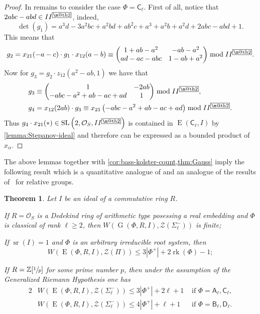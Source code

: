 \documentclass[11pt]{amsart}
\makeatletter
\theoremstyle{plain}
\newtheorem{thm}{Theorem}
\numberwithin{equation}{section}
\numberwithin{lemma}{section}
\theoremstyle{definition}
\theoremstyle{remark}
\DeclareMathOperator{\G}{G}
\DeclareMathOperator{\SL}{SL}
\DeclareMathOperator{\E}{E}
\DeclareMathOperator{\sr}{sr}
\DeclareMathOperator{\rk}{rk}
\newcommand{\rA}{\mathsf{A}}
\newcommand{\rB}{\mathsf{B}}
\newcommand{\rC}{\mathsf{C}}
\newcommand{\rD}{\mathsf{D}}
\newcommand{\indexbox}[1]{\text{\fboxsep=.1em\fbox{\m@th$\displaystyle#1$}}}
\makeatother
\begin{document}
\begin{proof}
In remains to consider the case $\Phi=\rC_\ell$. First of all, notice that $2abc-abd\in II^{\indexbox{2}}$, indeed,
\[ \det(g_1)=a^3d-3a^2bc+a^2bd+ab^2c+a^3+a^2b+a^2d+2abc-abd+1. \]
This means that
\[ g_2=x_{21}(-a-c)\cdot g_1\cdot x_{12}(a-b)\equiv
\begin{pmatrix}
1+ab-a^2 & -ab-a^2 \\ ad-ac-abc & 1-ab+a^2
\end{pmatrix}\bmod II^{\indexbox{2}}. \]
Now for $g_3=g_2\cdot z_{12}\left(a^2-ab, 1\right)$ we have that
\begin{align*}
& g_3\equiv\begin{pmatrix} 1 & -2ab \\ -abc-a^2+ab-ac+ad & 1 \end{pmatrix}\bmod II^{\indexbox{2}}, \\
& g_4=x_{12}(2ab)\cdot g_3\equiv x_{21}\left(-abc-a^2+ab-ac+ad\right)\bmod II^{\indexbox{2}}.
\end{align*}
Thus $g_4\cdot x_{21}(*)\in\SL\left(2, \mathcal{O}_S, II^{\indexbox{2}}\right)$ is contained in $\E(\rC_\ell, I)$ by \cref{lemma:Stepanov-ideal} and therefore can be expressed as a bounded product of $x_\alpha$.
\end{proof}
The above lemmas together with \cref{cor:bass-kolster-count,thm:Gauss} imply the following result
 which is a quantitative analogue of \cite[Theorem~3.4]{S} and an analogue of the results of~\cite{VseUnitrZ1p, VavSmSuUnitrEng, Tavgen91} for relative groups.
\begin{thm}\label{thm:width} Let $I$ be an ideal of a commutative ring $R$.
\begin{thmlist}
\item If $R=\mathcal{O}_S$ is a Dedekind ring of arithmetic type posessing a real embedding and $\Phi$ is classical of rank $\ell\geqslant2$, then 
$W(\G(\Phi, R, I), \mathcal{Z}(\Sigma_\ell^-))$ is finite;
\item If $\sr(I) = 1$ and $\Phi$ is an arbitrary irreducible root system, then 
\[W(\E(\Phi, R, I), \mathcal{Z}(\Pi))\leqslant 3|\Phi^+|+2\rk(\Phi)-1;\]
\item If $R = \mathbb{Z}[\sfrac{1}{p}]$ for some prime number $p$, then under the assumption of the Generalized Riemann Hypothesis one has
\begin{alignat*}{2}
& W(\E(\Phi, R, I), \mathcal{Z}(\Sigma_\ell^-))\leqslant 3|\Phi^+| + 2\ell + 1 & \text{ if } \Phi=\rA_\ell, \rC_\ell, \\
& W(\E(\Phi, R, I), \mathcal{Z}(\Sigma_\ell^-))\leqslant 4|\Phi^+| + \ell + 1 & \text{ if } \Phi=\rB_\ell, \rD_\ell.
\end{alignat*}
\end{thmlist}
\end{thm}

\printbibliography
\end{document}
